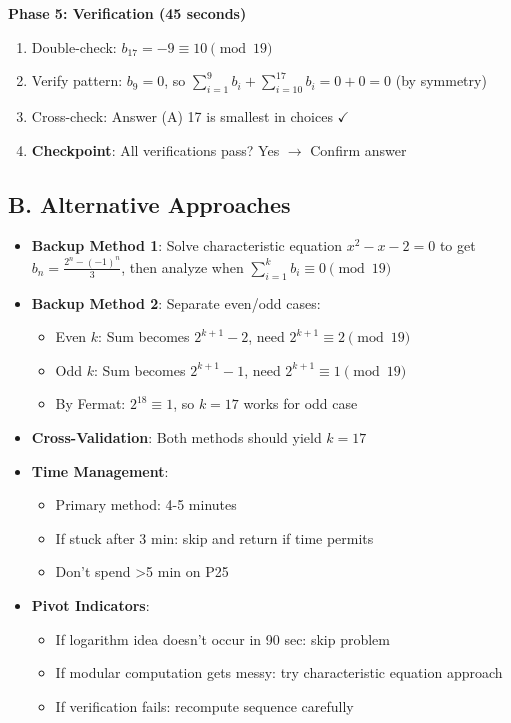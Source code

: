 \documentclass[11pt]{article}
\begin{document}
\begin{roadmapbox}
\textbf{Phase 5: Verification (45 seconds)}
\begin{enumerate}[leftmargin=*]
    \item Double-check: $b_{17} = -9 \equiv 10 \pmod{19}$
    \item Verify pattern: $b_9 = 0$, so $\sum_{i=1}^{9} b_i + \sum_{i=10}^{17} b_i = 0 + 0 = 0$ (by symmetry)
    \item Cross-check: Answer (A) 17 is smallest in choices $\checkmark$
    \item \textbf{Checkpoint}: All verifications pass? Yes $\rightarrow$ Confirm answer
\end{enumerate}

\subsection*{B. Alternative Approaches}
\begin{itemize}[leftmargin=*]
    \item \textbf{Backup Method 1}: Solve characteristic equation $x^2 - x - 2 = 0$ to get $b_n = \frac{2^n - (-1)^n}{3}$, then analyze when $\sum_{i=1}^{k} b_i \equiv 0 \pmod{19}$
    
    \item \textbf{Backup Method 2}: Separate even/odd cases:
    \begin{itemize}
        \item Even $k$: Sum becomes $2^{k+1} - 2$, need $2^{k+1} \equiv 2 \pmod{19}$
        \item Odd $k$: Sum becomes $2^{k+1} - 1$, need $2^{k+1} \equiv 1 \pmod{19}$
        \item By Fermat: $2^{18} \equiv 1$, so $k=17$ works for odd case
    \end{itemize}
    
    \item \textbf{Cross-Validation}: Both methods should yield $k=17$
    
    \item \textbf{Time Management}: 
    \begin{itemize}
        \item Primary method: 4-5 minutes
        \item If stuck after 3 min: skip and return if time permits
        \item Don't spend >5 min on P25
    \end{itemize}
    
    \item \textbf{Pivot Indicators}:
    \begin{itemize}
        \item If logarithm idea doesn't occur in 90 sec: skip problem
        \item If modular computation gets messy: try characteristic equation approach
        \item If verification fails: recompute sequence carefully
    \end{itemize}
\end{itemize}
\end{roadmapbox}
\end{document}
